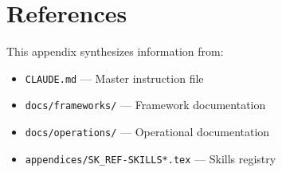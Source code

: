 
\section{References}
\label{sec:bo-references}

This appendix synthesizes information from:
\begin{itemize}
\item \texttt{CLAUDE.md} --- Master instruction file
\item \texttt{docs/frameworks/} --- Framework documentation
\item \texttt{docs/operations/} --- Operational documentation
\item \texttt{appendices/SK\_REF-SKILLS*.tex} --- Skills registry
\end{itemize}

\nocite{bcm_master}

